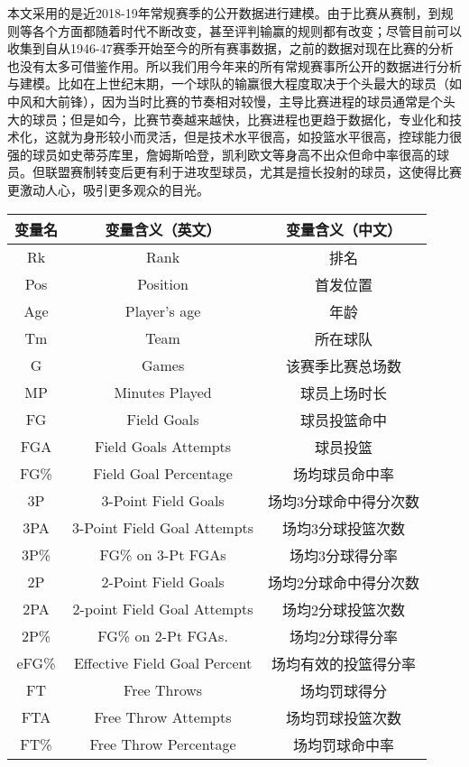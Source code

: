 本文采用的是近2018-19年常规赛季的公开数据进行建模。由于比赛从赛制，到规则等各个方面都随着时代不断改变，甚至评判输赢的规则都有改变；尽管目前可以收集到自从1946-47赛季开始至今的所有赛事数据，之前的数据对现在比赛的分析也没有太多可借鉴作用。所以我们用今年来的所有常规赛事所公开的数据进行分析与建模。比如在上世纪末期，一个球队的输赢很大程度取决于个头最大的球员（如中风和大前锋），因为当时比赛的节奏相对较慢，主导比赛进程的球员通常是个头大的球员；但是如今，比赛节奏越来越快，比赛进程也更趋于数据化，专业化和技术化，这就为身形较小而灵活，但是技术水平很高，如投篮水平很高，控球能力很强的球员如史蒂芬库里，詹姆斯哈登，凯利欧文等身高不出众但命中率很高的球员。但联盟赛制转变后更有利于进攻型球员，尤其是擅长投射的球员，这使得比赛更激动人心，吸引更多观众的目光。\cite{fixler2012fading}
\begin{table}[h!]
	\begin{center}
		\begin{tabular}{ |c|c|c| } 
			\hline
			变量名 &	变量含义（英文）&	变量含义（中文）
\\
			\hline
			Rk	&Rank&	排名
\\
			Pos	&Position&	首发位置
\\
			Age	&Player's age&	年龄
\\
			Tm	&Team&	所在球队
\\
			G&	Games	&该赛季比赛总场数
\\
			MP&	Minutes Played&	球员上场时长
\\
			FG&	Field Goals	&球员投篮命中
\\
			FGA	&Field Goals Attempts&	球员投篮
\\
			FG\%	&Field Goal Percentage&	场均球员命中率
\\
			3P&	3-Point Field Goals	&场均3分球命中得分次数
\\
			3PA	&3-Point Field Goal Attempts&	场均3分球投篮次数
\\
			3P\%&	FG\% on 3-Pt FGAs&	场均3分球得分率
\\
			2P&	2-Point Field Goals	&场均2分球命中得分次数
\\
			2PA&	2-point Field Goal Attempts&	场均2分球投篮次数
\\
			2P\%&	FG\% on 2-Pt FGAs.&	场均2分球得分率
\\
			eFG\%&	Effective Field Goal Percent&	场均有效的投篮得分率
\\
			FT&	Free Throws	&场均罚球得分
\\
			FTA	&Free Throw Attempts&	场均罚球投篮次数
\\
			FT\%	&Free Throw Percentage&	场均罚球命中率

\end{tabular}
\end{center}
\end{table}
